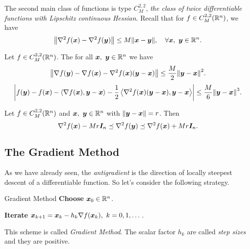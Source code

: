 The second main class of functions is type \(C^{2, 2}_M\), \emph{the class of twice differentiable functions with Lipschitz continuous Hessian}.
Recall that for \(f \in C^{2,2}_M(\mathbb{R}^n)\), we have
\[
    \norm{\hess f(\bm{x}) - \hess f(\bm{y})} \le M \norm{\bm{x} - \bm{y}}, \quad \forall \bm{x},~\bm{y} \in \R^n. 
\]

\begin{lemma}
    Let \(f \in C^{2,2}_M(\mathbb{R}^n)\). The for all \(\bm{x}, ~\bm{y} \in \mathbb{R}^n\) we have
    \begin{equation}\label{eq:C22M_1}
        \norm{\grad f(\bm{y}) - \grad f(\bm{x}) - \hess f(\bm{x})(\bm{y} -\bm{x})} \le \frac{M}{2} \norm{\bm{y} - \bm{x}}^2.
    \end{equation}
    \begin{equation}\label{eq:C22M_2}
        \abs{f(\bm{y}) - f(\bm{x}) - \innerprod{\grad f(\bm{x})}{\bm{y} - \bm{x}} - \frac{1}{2} \innerprod{\hess f(\bm{x})(\bm{y} -\bm{x})}{\bm{y} - \bm{x}}} \le \frac{M}{6} \norm{\bm{y} - \bm{x}}^3.
    \end{equation}
\end{lemma}

\begin{coro}
    Let \(f \in C^{2,2}_M(\mathbb{R}^n)\) and \(\bm{x},~\bm{y} \in \mathbb{R}^n\) with \(\norm{\bm{y} - \bm{x}} = r\). Then
    \[
        \hess f(\bm{x}) - Mr \bm{I}_n \preceq \hess f(\bm{y}) \preceq \hess f(\bm{x}) + Mr\bm{I}_n.  
    \]
\end{coro}

\subsection{The Gradient Method}

As we have already seen, the \emph{antigradient} is the direction of locally steepest
descent of a differentiable function. So let's consider the following strategy.

\begin{boxnote}{Gradient Method}
    \textbf{Choose} \(\bm{x}_0 \in \mathbb{R}^n\).

    \textbf{Iterate} \(\bm{x}_{k+1} = \bm{x}_k - h_k \nabla f(\bm{x}_k),~k=0, 1, \dots\).
\end{boxnote}

This scheme is called \emph{Gradient Method}. The scalar factor \(h_k\) are called \emph{step sizes} and they
are positive.

